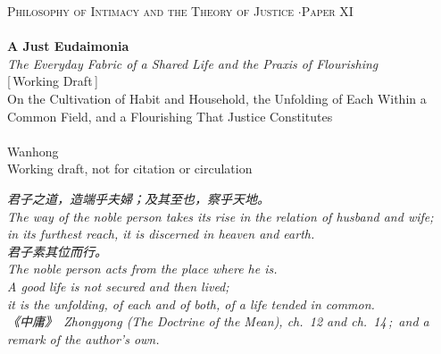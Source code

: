 \documentclass[11pt,a4paper]{article}
\begin{document}
\thispagestyle{empty}
\begin{center}
\vspace*{2cm}
{\footnotesize\color{rosedeep}\scshape Philosophy of Intimacy and the Theory of Justice \quad$\cdot$\quad Paper XI}\\[0.3cm]
\coverrule\\[1.2cm]
{\LARGE\bfseries\color{warnred} A Just Eudaimonia}\\[0.8cm]
{\large\itshape\color{warnred} The Everyday Fabric of a Shared Life and the Praxis of Flourishing}\\[0.8cm]
{\small\color{gold} [\,Working Draft\,]}\\[0.8cm]
{\normalsize\color{inksoft} On the Cultivation of Habit and Household, the Unfolding of Each Within a Common Field, and a Flourishing That Justice Constitutes}\\[2cm]
\coverrule[0.25]\\[0.6cm]
{\normalsize\color{inksoft} Wanhong}\\
\vfill
{\footnotesize\color{gold} Working draft, not for citation or circulation}
\coverfootnote
\end{center}
\newpage

\thispagestyle{empty}
\vspace*{2.4cm}
\begin{center}
\begin{minipage}{0.76\linewidth}
\centering\itshape\color{rose}
{\cjk 君子之道，造端乎夫婦；及其至也，察乎天地。}\\[0.3em]
The way of the noble person takes its rise in the relation of husband and wife;\\in its furthest reach, it is discerned in heaven and earth.\\[0.8em]
{\cjk 君子素其位而行。}\\[0.3em]
The noble person acts from the place where he is.\\[0.8em]
\upshape A good life is not secured and then lived;\\it is the unfolding, of each and of both, of a life tended in common.\\[0.6em]
{\upshape\footnotesize\color{gold} {\cjk《中庸》}\ \emph{Zhongyong} (The Doctrine of the Mean), ch.~12 and ch.~14\,;\ and a remark of the author's own.}
\end{minipage}
\end{center}
\newpage
\end{document}
